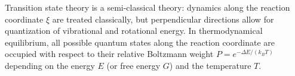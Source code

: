 \documentclass[11pt,DIV=13,BCOR=5mm,a4paper,headinclude]{scrbook}
\begin{document}
Transition state theory is a semi-classical theory: dynamics along the reaction coordinate $\xi$ are treated classically, but perpendicular directions allow for quantization of vibrational and rotational energy.
In thermodynamical equilibrium, all possible quantum states along the reaction coordinate are occupied with respect to their relative Boltzmann weight $P=e^{-\Delta E/(k_BT)}$ depending on the energy $E$ (or free energy $G$) and the temperature $T$.
\end{document}
